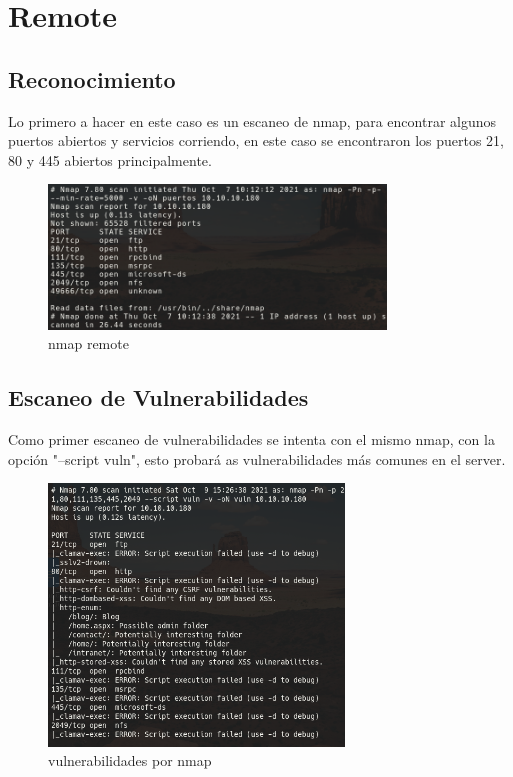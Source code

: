 \documentclass{article}
\begin{document}
\clearpage
\section{Remote}
\subsection{Reconocimiento}
Lo primero a hacer en este caso es un escaneo de nmap, para encontrar algunos puertos abiertos y servicios corriendo, en este caso se encontraron los puertos 21, 80 y 445 abiertos principalmente.

\begin{figure}[h]
	\center
	\includegraphics[width=0.8\textwidth]{images/remote/nmap_remote.png}
	\caption{nmap remote}
\end{figure}
 
\subsection{Escaneo de Vulnerabilidades}

Como primer escaneo de vulnerabilidades se intenta con el mismo nmap, con la opción "--script vuln", esto probará as vulnerabilidades más comunes en el server.

\begin{figure}[h]
	\center
	\includegraphics[width=0.7\textwidth]{images/remote/nmap_vuln.png}
	\caption{vulnerabilidades por nmap}
\end{figure}
\end{document}
